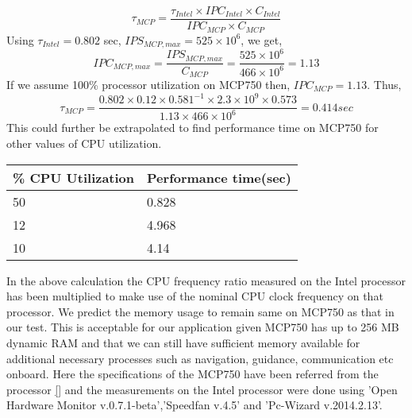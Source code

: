         \begin{equation}
        \tau_{MCP}=\frac{\tau_{Intel} \times IPC_{Intel} \times C_{Intel} }{IPC_{MCP} \times C_{MCP}}
        \end{equation}
        \noindent Using $\tau_{Intel} = 0.802$ sec, $IPS_{MCP,max} = 525\times 10^{6}$, we get,
        \begin{equation}
        IPC_{MCP,max} = \frac{IPS_{MCP,max}}{C_{MCP}} = \frac{525\times 10^{6}}{466\times 10^{6}}= 1.13
        \end{equation}
%
        \noindent If we assume 100\% processor utilization on MCP750 then, $IPC_{MCP} = 1.13.$ Thus,
%
\begin{equation}
        \tau_{MCP}=\frac{0.802 \times 0.12 \times 0.581^{-1} \times 2.3 \times 10^{9} \times 0.573}{1.13 \times 466\times 10^{6}} = 0.414 sec
        \end{equation}\newline
%
\noindent  This could further be extrapolated to find performance time on MCP750 for other values of CPU utilization.\newline
% 
        \begin{table}[h]
                \centering
                
                \begin{tabular}{ |l|l| }
                        \hline
                        \% CPU Utilization & Performance time(sec)\\ \hline
                        50 & 0.828 \\ \hline
                        12 & 4.968 \\ \hline
                        10 & 4.14 \\
                        \hline
                \end{tabular}
        \end{table}
%
\noindent
 In the above calculation the CPU frequency ratio measured on the Intel processor has been multiplied to make use of the nominal CPU clock frequency on that processor. We predict the memory usage to remain same on MCP750 as that in our test.  This is acceptable for our application given MCP750 has up to 256 MB dynamic RAM and that we can still have sufficient memory available for additional necessary processes such as navigation, guidance, communication etc onboard. Here the specifications of the MCP750 have been referred from the processor \ref{} and the measurements on the Intel processor were done using 'Open Hardware Monitor v.0.7.1-beta','Speedfan v.4.5' and 'Pc-Wizard v.2014.2.13'.
